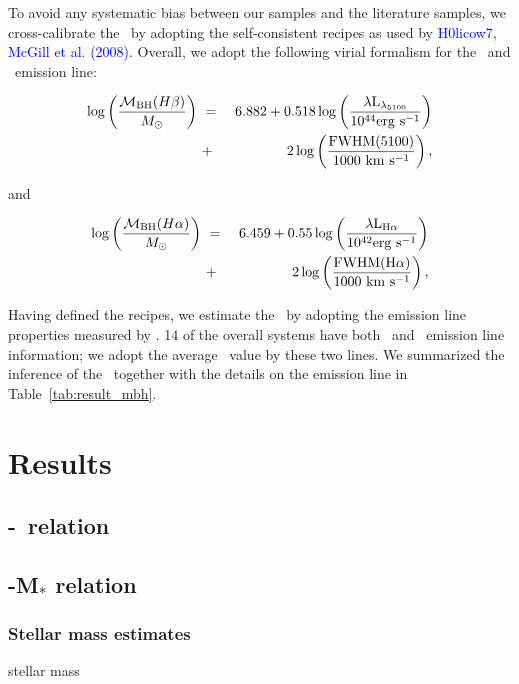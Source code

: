 \documentclass[apj]{emulateapj}
\begin{document}
To avoid any systematic bias between our samples and the literature samples, we cross-calibrate the \mbh\ by adopting the self-consistent recipes as used by \textcolor{blue}{H0licow7, McGill et al. (2008)}. Overall, we adopt the following virial formalism for the \halpha\ and \hbeta\ emission line:

\begin{eqnarray}
\label{eq:Hb}
\log \left(\frac{\mathcal M_{\rm BH}(H\beta) }{M_{\odot}}\right)&~=~& 6.882+0.518\log \left(\frac{ \lambda \rm L _{\lambda_{5100}}}{10^{44}{\rm erg~s^{-1}}}\right) \nonumber\\
&~+~& 2 \log \left(\frac{\rm FWHM(5100)}{1000 ~{\rm km~s^{-1}}}\right) , 
\end {eqnarray}

and

\begin{eqnarray}
\label{eq:Ha}
\log \left(\frac{\mathcal M_{\rm BH} (H\alpha)}{M_{\odot}}\right)&~=~& 6.459+0.55 \log \left(\frac{ \lambda \rm L _{H\alpha}}{10^{42}{\rm erg~s^{-1}}}\right) \nonumber\\
&~+~& 2 \log \left(\frac{\rm FWHM(H\alpha)}{1000 ~{\rm km~s^{-1}}}\right) , 
\end {eqnarray}

Having defined the recipes, we estimate the \mbh\ by adopting the emission line properties measured by \citet{Schulze2018}. 14 of the overall systems have both \halpha\ and \hbeta\ emission line information; we adopt the average \mbh\ value by these two lines. We summarized the inference of the \mbh\ together with the details on the emission line in Table~\ref{tab:result_mbh}.


\section{Results}
\label{sec:result}
\subsection{\mbh-\lhost\ relation}

\subsection{\mbh-M$_*$ relation}
\subsubsection{Stellar mass estimates}
stellar mass \\
\end{document}
